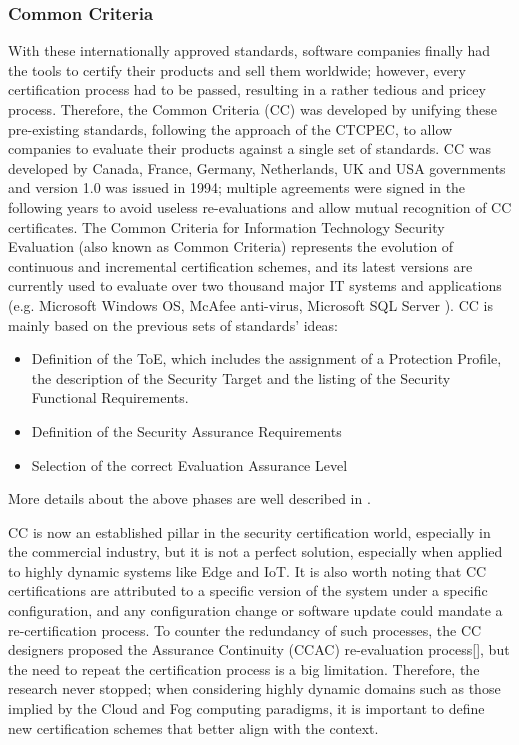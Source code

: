 \subsubsection{Common Criteria}
\label{CC}
With these internationally approved standards, software companies finally had the tools to certify their products and sell them worldwide; however, every certification process had to be passed, resulting in a rather tedious and pricey process. Therefore, the Common Criteria (CC) was developed by unifying these pre-existing standards, following the approach of the CTCPEC, to allow companies to evaluate their products against a single set of standards. CC was developed by Canada, France, Germany, Netherlands, UK and USA governments and version 1.0 was issued in 1994; multiple agreements were signed in the following years to avoid useless re-evaluations and allow mutual recognition of CC certificates.
The Common Criteria for Information Technology Security Evaluation (also known as Common Criteria) represents the evolution of continuous and incremental certification schemes, and its latest versions are currently used to evaluate over two thousand major IT systems and applications (e.g. Microsoft Windows OS, McAfee anti-virus, Microsoft SQL Server \cite{CCProducts}).
CC is mainly based on the previous sets of standards' ideas:
\begin{itemize}
    \item Definition of the ToE, which includes the assignment of a Protection Profile, the description of the Security Target and the listing of the Security Functional Requirements.
    \item Definition of the Security Assurance Requirements
    \item Selection of the correct Evaluation Assurance Level
\end{itemize}

More details about the above phases are well described in \cite{infrastructure2002common}.

CC is now an established pillar in the security certification world, especially in the commercial industry, but it is not a perfect solution, especially when applied to highly dynamic systems like Edge and IoT. It is also worth noting that CC certifications are attributed to a specific version of the system under a specific configuration, and any configuration change or software update could mandate a re-certification process. To counter the redundancy of such processes, the CC designers proposed the Assurance Continuity (CCAC) re-evaluation process[], but the need to repeat the certification process is a big limitation. Therefore, the research never stopped; when considering highly dynamic domains such as those implied by the Cloud and Fog computing paradigms, it is important to define new certification schemes that better align with the context. 

